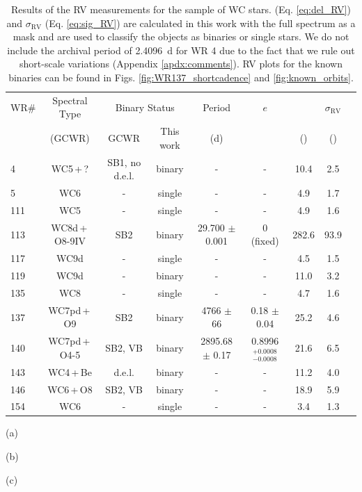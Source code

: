 \begin{table}
\small
\setlength{\tabcolsep}{0pt}
\centering
\caption{Results of the RV measurements for the sample of WC stars. \DelRV{} (Eq. \ref{eq:del_RV}) and $\sigma_\textrm{RV}$ (Eq. \ref{eq:sig_RV}) are calculated in this work with the full spectrum as a mask and are used to classify the objects as binaries or single stars. We do not include the archival period of 2.4096~d for WR 4 due to the fact that we rule out short-scale variations (Appendix \ref{apdx:comments}). RV plots for the known binaries can be found in Figs. \ref{fig:WR137_shortcadence} and \ref{fig:known_orbits}.}

\begin{threeparttable}
\centering
\begin{tabular*}{\textwidth}{l @{\extracolsep{\fill}}*{8}{c}}
\toprule
\toprule

WR\# & Spectral Type & \multicolumn{2}{c}{Binary Status}  & Period & $e$ & \DelRV{}  & $\sigma_\textrm{RV}$  \\ \cline{3-4}
 & (GCWR) & GCWR & This work & (d) & &(\kms{}) &(\kms{})\\\hline 
 \midrule
4 & WC5\,+\,? & SB1, no d.e.l. & binary & - & - & 10.4 & 2.5\\
5 & WC6 & - & single & - & - & 4.9 & 1.7\\
111 & WC5 & - & single & - & - & 4.9 & 1.6\\
113 & WC8d\,+\,O8-9IV & SB2 & binary & 29.700 $\pm$ 0.001\tnote{(a)} & 0 (fixed)\tnote{(a)} & 282.6 & 93.9\\
117 & WC9d & - & single & - & - & 4.5 & 1.5\\
119 & WC9d & - & binary & - & - & 11.0 & 3.2\\
135 & WC8 & - & single & - & - & 4.7 & 1.6\\
137 & WC7pd\,+\,O9 & SB2 & binary & 4766 $\pm$ 66\tnote{(b)} & 0.18 $\pm$ 0.04\tnote{(b)} & 25.2 & 4.6\\
140 & WC7pd\,+\,O4-5 & SB2, VB & binary & 2895.68 $\pm$ 0.17\tnote{(c)} & 0.8996$^{+0.0008}_{-0.0008}$\tnote{(c)} & 21.6 & 6.5\\
143 & WC4\,+\,Be & d.e.l. & binary & - & - & 11.2 & 4.0\\
146 & WC6\,+\,O8 & SB2, VB & binary & - & - & 18.9 & 5.9\\
154 & WC6 & - & single & - & - & 3.4 & 1.3\\ %
\bottomrule
\end{tabular*}
\begin{tablenotes}
    \item[(a)] \citet{david-uraz_using_2012}
    \item[(b)] \citet{lefevre_spectroscopic_2005}
    \item[(c)] \citet{thomas_orbit_2021}
\end{tablenotes}
\end{threeparttable}
\label{tab:WC_data}
\end{table}
